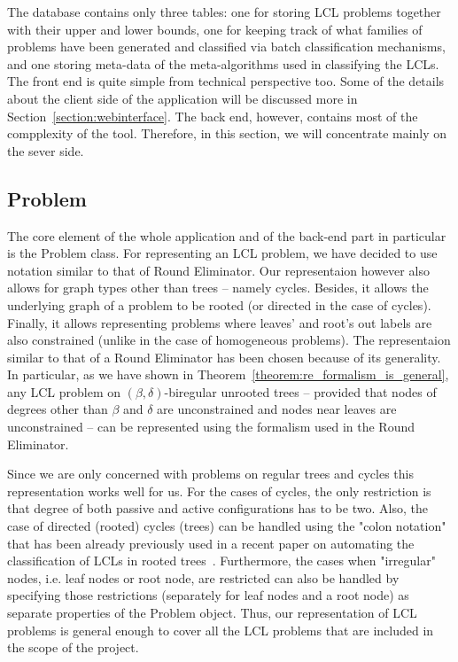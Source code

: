 The database contains only three tables: one for
storing LCL problems together with their upper and
lower bounds, one for keeping track of what families of
problems have been generated and classified via batch
classification mechanisms, and one storing meta-data
of the meta-algorithms used in classifying the LCLs.
The front end is quite simple from technical perspective
too. Some of the details about the client side of the
application will be discussed more in Section~\ref{section:webinterface}.
The back end, however, contains most of the compplexity of
the tool. Therefore, in this section, we will concentrate
mainly on the sever side.

\subsection{Problem}

The core element of the whole application and of the
back-end part in particular is the Problem class.
For representing an LCL problem, we have decided
to use notation similar to that of Round
Eliminator. Our representaion however also
allows for graph types other than trees -- namely cycles.
Besides, it allows the underlying graph of a problem
to be rooted (or directed in the case of cycles).
Finally, it allows representing problems where
leaves' and root's out labels are also constrained
(unlike in the case of homogeneous problems).
The representaion similar to that of a Round
Eliminator has been chosen because of its generality.
In particular, as we have shown in Theorem~\ref{theorem:re_formalism_is_general},
any LCL problem
on $(\beta, \delta)$-biregular unrooted trees -- provided
that nodes of degrees other than $\beta$ and $\delta$ are unconstrained
and nodes near leaves are unconstrained -- can be represented
using the formalism used in the Round Eliminator.

Since we are only concerned with problems on regular trees and cycles
this representation works well for us. For the cases of cycles,
the only restriction is that degree of both passive and
active configurations has to be two. Also, the case
of directed (rooted) cycles (trees) can be handled
using the "colon notation" that has been already
previously used in a recent paper on automating
the classification of LCLs in rooted trees~\cite{Balliu2021}.
Furthermore, the cases when "irregular" nodes, i.e.
leaf nodes or root node, are restricted can also
be handled by specifying those restrictions
(separately for leaf nodes and a root node)
as separate properties of the Problem object.
Thus, our representation of LCL problems is general
enough to cover all the LCL problems that are
included in the scope of the project.


